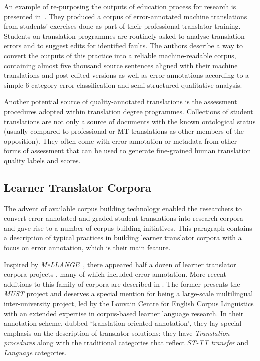 An example of re-purposing the outputs of education process for research is presented in~\citet{Wisniewski2014}. They produced a corpus of error-annotated machine translations from students' exercises done as part of their professional translator training. Students on translation programmes are routinely asked to analyse translation errors and to suggest edits for identified faults. The authors describe a way to convert the outputs of this practice into a reliable machine-readable corpus, containing almost five thousand source sentences aligned with their machine translations and post-edited versions as well as error annotations according to a simple 6-category error classification and semi-structured qualitative analysis.

Another potential source of quality-annotated translations is the assessment procedures adopted within translation degree programmes. Collections of student translations are not only a source of documents with the known ontological status (usually compared to professional or MT translations as other members of the opposition). They often come with error annotation or metadata from other forms of assessment that can be used to generate fine-grained human translation quality labels and scores.

\subsection{\label{ssec:ltc}Learner Translator Corpora}

The advent of available corpus building technology enabled the researchers to convert error-annotated and graded student translations into research corpora and gave rise to a number of corpus-building initiatives.
This paragraph contains a description of typical practices in building learner translator corpora with a focus on error annotation, which is their main feature.

Inspired by \textit{MeLLANGE}~\cite{Castagnoli2011b}, there appeared half a dozen of learner translator corpora projects \cite{Wurm2013, Lapshinova2013, Stepankova2014, Espunya2014, Kutuzov2014rltc,Fictumova2017}, many of which included error annotation. More recent additions to this family of corpora are described in \citet{Granger2018,Alfuraih2019}. The former presents the \textit{MUST} project and deserves a special mention for being a large-scale multilingual inter-university project, led by the Louvain Centre for English Corpus Linguistics with an extended expertise in corpus-based learner language research. In their annotation scheme, dubbed `translation-oriented annotation', they lay special emphasis on the description of translator solutions: they have \textit{Translation procedures} along with the traditional categories that reflect \textit{ST-TT transfer} and \textit{Language} categories. 

